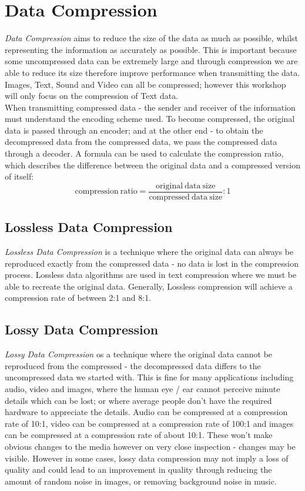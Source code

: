 
\section{Data Compression}
\textit{Data Compression} aims to reduce the size of the data as much as possible, whilst representing the information as accurately as possible. This is important because some uncompressed data can be extremely large and through compression we are able to reduce its size therefore improve performance when transmitting the data. Images, Text, Sound and Video can all be compressed; however this workshop will only focus on the compression of Text data.\\

When transmitting compressed data - the sender and receiver of the information must understand the encoding scheme used. To become compressed, the original data is passed through an encoder; and at the other end - to obtain the decompressed data from the compressed data, we pass the compressed data through a decoder. A formula can be used to calculate the compression ratio, which describes the difference between the original data and a compressed version of itself:
\[\mathrm{compression\ ratio} = \frac{\mathrm{original\ data\ size}}{\mathrm{compressed\ data\ size}} : 1\]

\subsection{Lossless Data Compression}
\textit{Lossless Data Compression} is a technique where the original data can always be reproduced exactly from the compressed data - no data is lost in the compression process. Lossless data algorithms are used in text compression where we must be able to recreate the original data. Generally, Lossless compression will achieve a compression rate of between 2:1 and 8:1. 

\subsection{Lossy Data Compression}
\textit{Lossy Data Compression} os a technique where the original data cannot be reproduced from the compressed - the decompressed data differs to the uncompressed data we started with. This is fine for many applications including audio, video and images, where the human eye / ear cannot perceive minute details which can be lost; or where average people don't have the required hardware to appreciate the details. Audio can be compressed at a compression rate of 10:1, video can be compressed at a compression rate of 100:1 and images can be compressed at a compression rate of about 10:1. These won't make obvious changes to the media however on very close inspection - changes may be visible. However in some cases, lossy data compression may not imply a loss of quality and could lead to an improvement in quality through reducing the amount of random noise in images, or removing background noise in music. 

